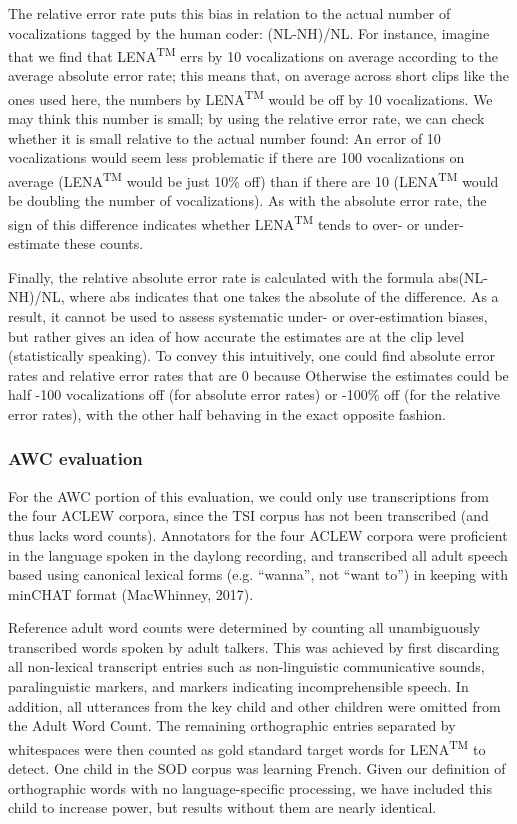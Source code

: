 \documentclass[english,floatsintext,man]{apa6}
\begin{document}
The relative error rate puts this bias in relation to the actual number
of vocalizations tagged by the human coder: (NL-NH)/NL. For instance,
imagine that we find that LENA\textsuperscript{TM} errs by 10
vocalizations on average according to the average absolute error rate;
this means that, on average across short clips like the ones used here,
the numbers by LENA\textsuperscript{TM} would be off by 10
vocalizations. We may think this number is small; by using the relative
error rate, we can check whether it is small relative to the actual
number found: An error of 10 vocalizations would seem less problematic
if there are 100 vocalizations on average (LENA\textsuperscript{TM}
would be just 10\% off) than if there are 10 (LENA\textsuperscript{TM}
would be doubling the number of vocalizations). As with the absolute
error rate, the sign of this difference indicates whether
LENA\textsuperscript{TM} tends to over- or under-estimate these counts.

Finally, the relative absolute error rate is calculated with the formula
abs(NL-NH)/NL, where abs indicates that one takes the absolute of the
difference. As a result, it cannot be used to assess systematic under-
or over-estimation biases, but rather gives an idea of how accurate the
estimates are at the clip level (statistically speaking). To convey this
intuitively, one could find absolute error rates and relative error
rates that are 0 because Otherwise the estimates could be half -100
vocalizations off (for absolute error rates) or -100\% off (for the
relative error rates), with the other half behaving in the exact
opposite fashion.

\subsubsection{AWC evaluation}\label{awc-evaluation}

For the AWC portion of this evaluation, we could only use transcriptions
from the four ACLEW corpora, since the TSI corpus has not been
transcribed (and thus lacks word counts). Annotators for the four ACLEW
corpora were proficient in the language spoken in the daylong recording,
and transcribed all adult speech based using canonical lexical forms
(e.g. \enquote{wanna}, not \enquote{want to}) in keeping with minCHAT
format (MacWhinney, 2017).

Reference adult word counts were determined by counting all
unambiguously transcribed words spoken by adult talkers. This was
achieved by first discarding all non-lexical transcript entries such as
non-linguistic communicative sounds, paralinguistic markers, and markers
indicating incomprehensible speech. In addition, all utterances from the
key child and other children were omitted from the Adult Word Count. The
remaining orthographic entries separated by whitespaces were then
counted as gold standard target words for LENA\textsuperscript{TM} to
detect. One child in the SOD corpus was learning French. Given our
definition of orthographic words with no language-specific processing,
we have included this child to increase power, but results without them
are nearly identical.
\end{document}
